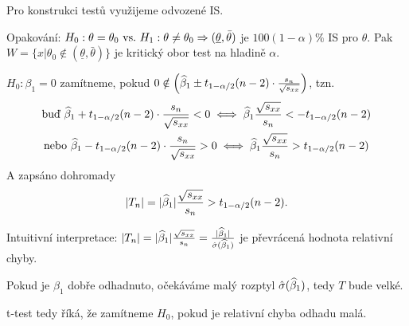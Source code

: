 Pro konstrukci testů využijeme odvozené IS.

\begin{remark}
	Opakování: $H_0: \theta = \theta_0 ~\text{vs.}~ H_1: \theta \neq \theta_0 \Rightarrow (\underline{\theta}, \bar{\theta})$ je $100(1-\alpha)\%$ IS pro $\theta$. Pak $W = \{ x | \theta_0 \notin (\underline{\theta}, \bar{\theta}) \}$ je kritický obor test na hladině $\alpha$.
\end{remark}

$H_0: \beta_1 = 0$ zamítneme, pokud $0 \notin \left( \widehat{\beta}_1 \pm t_{1-\alpha/2}(n-2) \cdot  \frac{s_n}{\sqrt{s_{xx}}} \right)$, tzn.
\begin{gather*}
	\text{buď } \widehat{\beta}_1 + t_{1-\alpha/2}(n-2) \cdot  \frac{s_n}{\sqrt{s_{xx}}} < 0 \iff  \widehat{\beta}_1 \frac{\sqrt{s_{xx}}}{s_n} < - t_{1-\alpha/2}(n-2) \\
	\text{nebo } \widehat{\beta}_1 - t_{1-\alpha/2}(n-2) \cdot  \frac{s_n}{\sqrt{s_{xx}}} > 0 \iff \widehat{\beta}_1 \frac{\sqrt{s_{xx}}}{s_n} > t_{1-\alpha/2}(n-2)
\end{gather*}
A zapsáno dohromady
$$
	|T_n| = |\widehat{\beta}_1| \frac{\sqrt{s_{xx}}}{s_n} > t_{1-\alpha/2}(n-2).
$$

\begin{remark}
	Intuitivní interpretace: $|T_n| = |\widehat{\beta}_1| \frac{\sqrt{s_{xx}}}{s_n} = \frac{|\widehat{\beta}_1|}{\hat{\sigma}(\widehat{\beta}_1)}$ je převrácená hodnota relativní chyby.
	
	Pokud je $\beta_1$ dobře odhadnuto, očekáváme malý rozptyl $\hat{\sigma}(\widehat{\beta}_1)$, tedy $T$ bude velké.
	
	t-test tedy říká, že zamítneme $H_0$, pokud je relativní chyba odhadu malá.
\end{remark}